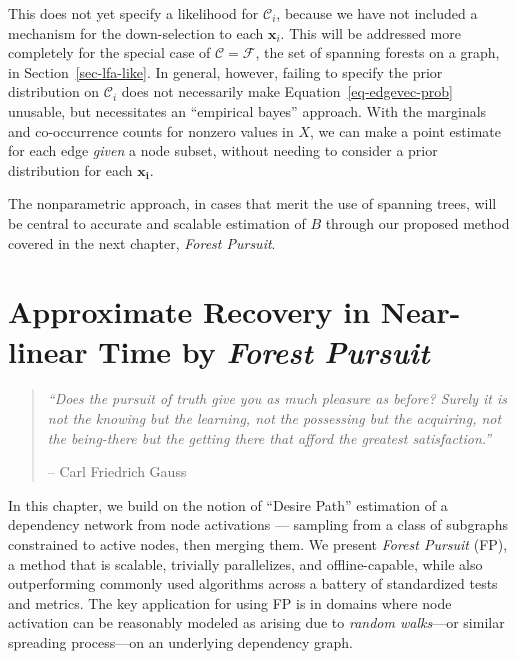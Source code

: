 \documentclass[%
	12pt,
		oneside,
		letterpaper
]{book}
\begin{document}
This does not yet specify a likelihood for \(\mathcal{C}_i\), because we
have not included a mechanism for the down-selection to each
\(\mathbf{x}_i\). This will be addressed more completely for the special
case of \(\mathcal{C}=\mathcal{F}\), the set of spanning forests on a
graph, in Section~\ref{sec-lfa-like}. In general, however, failing to
specify the prior distribution on \(\mathcal{C}_i\) does not necessarily
make Equation~\ref{eq-edgevec-prob} unusable, but necessitates an
``empirical bayes'' approach. With the marginals and co-occurrence
counts for nonzero values in \(X\), we can make a point estimate for
each edge \emph{given} a node subset, without needing to consider a
prior distribution for each \(\mathbf{x_i}\).

The nonparametric approach, in cases that merit the use of spanning
trees, will be central to accurate and scalable estimation of \(B\)
through our proposed method covered in the next chapter, \emph{Forest
Pursuit}.

\chapter{\texorpdfstring{Approximate Recovery in Near-linear Time by
\emph{Forest
Pursuit}}{Approximate Recovery in Near-linear Time by Forest Pursuit}}\label{sec-fp}

\begin{flushright}

\begin{minipage}{.7\linewidth}

\singlespacing

\begin{quote}
\emph{``Does the pursuit of truth give you as much pleasure as before?
Surely it is not the knowing but the learning, not the possessing but
the acquiring, not the being-there but the getting there that afford the
greatest satisfaction.''}

\hfill -- Carl Friedrich Gauss\\
\doublespacing
\end{quote}

\end{minipage}

\end{flushright}

In this chapter, we build on the notion of ``Desire Path'' estimation of
a dependency network from node activations --- sampling from a class of
subgraphs constrained to active nodes, then merging them. We present
\emph{Forest Pursuit} (FP), a method that is scalable, trivially
parallelizes, and offline-capable, while also outperforming commonly
used algorithms across a battery of standardized tests and metrics. The
key application for using FP is in domains where node activation can be
reasonably modeled as arising due to \emph{random walks}---or similar
spreading process---on an underlying dependency graph.
\end{document}
